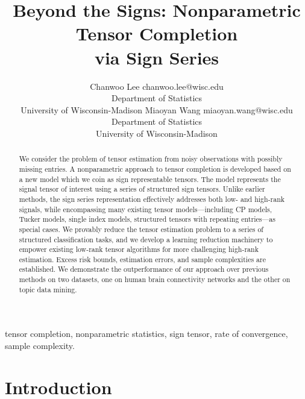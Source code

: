 \documentclass[twoside,11pt]{article}
\theoremstyle{plain}
\theoremstyle{definition}
\begin{document}
\title{Beyond the Signs: Nonparametric Tensor Completion \\via Sign Series}

\author{\name Chanwoo Lee  \email chanwoo.lee@wisc.edu \\
       \addr Department of Statistics\\
       University of Wisconsin-Madison
       \AND
       \name Miaoyan Wang \email miaoyan.wang@wisc.edu \\
       \addr Department of Statistics\\
       University of Wisconsin-Madison}

\editor{}

\maketitle

\begin{abstract}
We consider the problem of tensor estimation from noisy observations with possibly missing entries. A nonparametric approach to tensor completion is developed based on a new model which we coin as sign representable tensors. The model represents the signal tensor of interest using a series of structured sign tensors. Unlike earlier methods, the sign series representation effectively addresses both low- and high-rank signals, while encompassing many existing tensor models---including CP models, Tucker models, single index models, structured tensors with repeating entries---as special cases. We provably reduce the tensor estimation problem to a series of structured classification tasks, and we develop a learning reduction machinery to empower existing low-rank tensor algorithms for more challenging high-rank estimation. Excess risk bounds, estimation errors, and sample complexities are established. We demonstrate the outperformance of our approach over previous methods on two datasets, one on human brain connectivity networks and the other on topic data mining. 
\end{abstract}

\begin{keywords}
  tensor completion, nonparametric statistics, sign tensor, rate of convergence, sample complexity.
\end{keywords}

\section{Introduction}\label{sec:intro}
\end{document}
